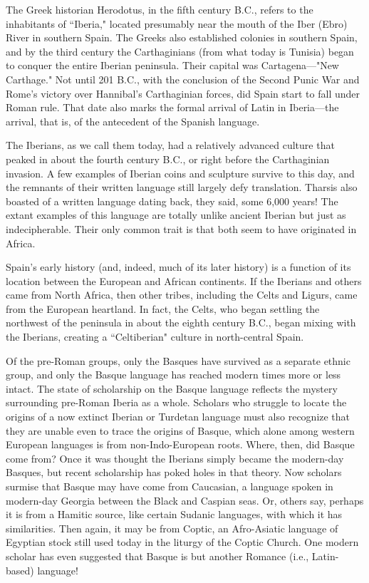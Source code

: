 The Greek historian Herodotus, in the fifth century B.C., refers
to the inhabitants of ``Iberia," located presumably near the mouth of
the Iber (Ebro) River in southern Spain. The Greeks also established
colonies in southern Spain, and by the third century the Carthaginians (from what today is Tunisia) began to conquer the entire Iberian
peninsula. Their capital was Cartagena---"New Carthage." Not until
201 B.C., with the conclusion of the Second Punic War and Rome's victory over Hannibal's Carthaginian forces, did Spain start to fall under
Roman rule. That date also marks the formal arrival of Latin in Iberia---the arrival, that is, of the antecedent of the Spanish language.

The Iberians, as we call them today, had a relatively advanced
culture that peaked in about the fourth century B.C., or right before
the Carthaginian invasion. A few examples of Iberian coins and sculpture survive to this day, and the remnants of their written language
still largely defy translation. Tharsis also boasted of a written language dating back, they said, some 6,000 years! The extant examples
of this language are totally unlike ancient Iberian but just as indecipherable. Their only common trait is that both seem to have originated in Africa.

Spain's early history (and, indeed, much of its later history) is a
function of its location between the European and African continents.
If the Iberians and others came from North Africa, then other tribes,
including the Celts and Ligurs, came from the European heartland. In
fact, the Celts, who began settling the northwest of the peninsula in
about the eighth century B.C., began mixing with the Iberians, creating
a ``Celtiberian" culture in north-central Spain.

Of the pre-Roman groups, only the Basques have survived
as a separate ethnic group, and only the Basque language has reached
modern times more or less intact. The state of scholarship on the
Basque language reflects the mystery surrounding pre-Roman Iberia
as a whole. Scholars who struggle to locate the origins of a now extinct
Iberian or Turdetan language must also recognize that they are unable
even to trace the origins of Basque, which alone among
western European languages is from non-Indo-European roots. Where, then, did
Basque come from? Once it was thought the Iberians simply became
the modern-day Basques, but recent scholarship has poked holes in
that theory. Now scholars surmise that Basque may have come from
Caucasian, a language spoken in modern-day Georgia between the
Black and Caspian seas. Or, others say, perhaps it is from a Hamitic
source, like certain Sudanic languages, with which it has similarities.
Then again, it may be from Coptic, an Afro-Asiatic language of Egyptian stock still used today in the liturgy of the Coptic Church. One
modern scholar has even suggested that Basque is but another Romance (i.e., Latin-based) language!

